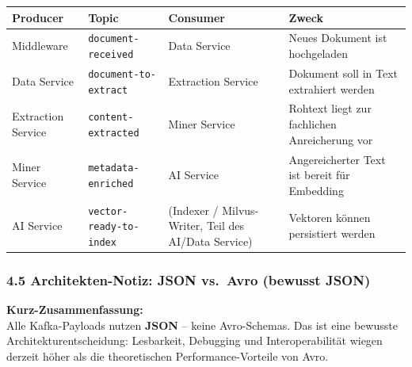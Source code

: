 {\def\LTcaptype{none} %
\begin{longtable}[]{@{}
  >{\raggedright\arraybackslash}p{}
  >{\raggedright\arraybackslash}p{}
  >{\raggedright\arraybackslash}p{}
  >{\raggedright\arraybackslash}p{}@{}}
\toprule\noalign{}
\begin{minipage}[b]{\linewidth}\raggedright
Producer
\end{minipage} & \begin{minipage}[b]{\linewidth}\raggedright
Topic
\end{minipage} & \begin{minipage}[b]{\linewidth}\raggedright
Consumer
\end{minipage} & \begin{minipage}[b]{\linewidth}\raggedright
Zweck
\end{minipage} \\
\midrule\noalign{}
\endhead
\bottomrule\noalign{}
\endlastfoot
Middleware & \texttt{document-received} & Data Service & Neues Dokument
ist hochgeladen \\
Data Service & \texttt{document-to-extract} & Extraction Service &
Dokument soll in Text extrahiert werden \\
Extraction Service & \texttt{content-extracted} & Miner Service &
Rohtext liegt zur fachlichen Anreicherung vor \\
Miner Service & \texttt{metadata-enriched} & AI Service & Angereicherter
Text ist bereit für Embedding \\
AI Service & \texttt{vector-ready-to-index} & (Indexer / Milvus-Writer,
Teil des AI/Data Service) & Vektoren können persistiert werden \\
\end{longtable}
}

\subsubsection{4.5 Architekten-Notiz: JSON vs.~Avro (bewusst
JSON)}\label{architekten-notiz-json-vs.-avro-bewusst-json}

\textbf{Kurz-Zusammenfassung:}\\
Alle Kafka-Payloads nutzen \textbf{JSON} -- keine Avro-Schemas. Das ist
eine bewusste Architekturentscheidung: Lesbarkeit, Debugging und
Interoperabilität wiegen derzeit höher als die theoretischen
Performance-Vorteile von Avro.

